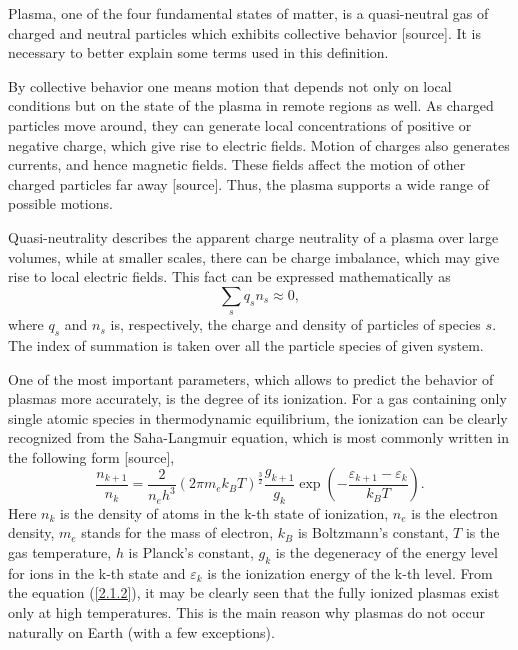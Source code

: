 Plasma, one of the four fundamental states of matter, is a quasi-neutral gas of charged and neutral particles which exhibits collective behavior [source]. It is necessary to better explain some terms used in this definition.

By collective behavior one means motion that depends not only on local conditions but on the state of the plasma in remote regions as well. As charged particles move around, they can generate local concentrations of positive or negative charge, which give rise to electric fields. Motion of charges also generates currents, and hence magnetic fields. These fields affect the motion of other charged particles far away [source]. Thus, the plasma supports a wide range of possible motions.

Quasi-neutrality describes the apparent charge neutrality of a plasma over large volumes, while at smaller scales, there can be charge imbalance, which may give rise to local electric fields. This fact can be expressed mathematically as
\begin{equation}
\label{2.1.1}
\sum_{s} q_s n_s \approx 0,
\end{equation}
where $ q_s $ and $ n_s $ is, respectively, the charge and density of particles of species $ s $. The index of summation is taken over all the particle species of given system.

One of the most important parameters, which allows to predict the behavior of plasmas more accurately, is the degree of its ionization. For a gas containing only single atomic species in thermodynamic equilibrium, the ionization can be clearly recognized from the Saha-Langmuir equation, which is most commonly written in the following form [source],
\begin{equation}
\label{2.1.2}
\frac{n_{k+1}}{n_k} = \frac{2}{n_e h^3}\left(2\pi m_e k_B T\right)^{\frac{3}{2}} \frac{g_{k+1}}{g_k} \exp\left(-\frac{\varepsilon_{k+1} - \varepsilon_{k}}{k_{B} T} \right).
\end{equation}
Here $ n_k $ is the density of atoms in the k-th state of ionization, $ n_e $ is the electron density, $ m_e $ stands for the mass of electron, $ k_B $ is Boltzmann's constant, $ T $ is the gas temperature, $ h $ is Planck's constant, $ g_k $ is the degeneracy of the energy level for ions in the k-th state and $ \varepsilon_k $ is the ionization energy of the k-th level. From the equation (\ref{2.1.2}), it may be clearly seen that the fully ionized plasmas exist only at high temperatures. This is the main reason why plasmas do not occur naturally on Earth (with a few exceptions).

